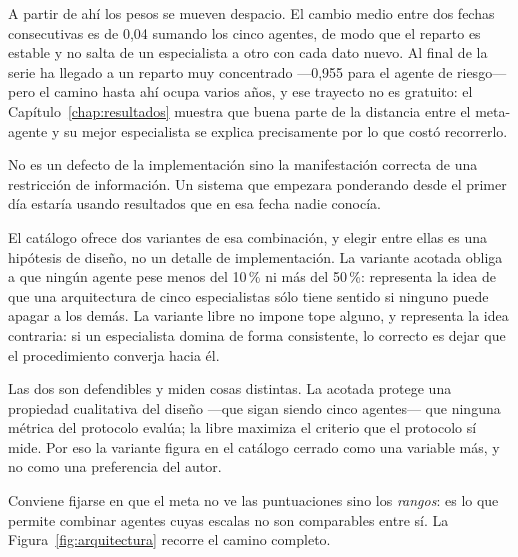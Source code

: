 A partir de ahí los pesos se mueven despacio. El cambio medio entre dos fechas consecutivas es de
0,04 sumando los cinco agentes, de modo que el reparto es estable y no salta de un especialista a
otro con cada dato nuevo. Al final de la serie ha llegado a un reparto muy concentrado ---0,955 para
el agente de riesgo--- pero el camino hasta ahí ocupa varios años, y ese trayecto no es gratuito: el
Capítulo~\ref{chap:resultados} muestra que buena parte de la distancia entre el meta-agente y su
mejor especialista se explica precisamente por lo que costó recorrerlo.

No es un defecto de la implementación sino la manifestación correcta de una restricción de
información. Un sistema que empezara ponderando desde el primer día estaría usando resultados que en
esa fecha nadie conocía.

El catálogo ofrece dos variantes de esa combinación, y elegir entre ellas es una hipótesis de diseño,
no un detalle de implementación. La variante acotada obliga a que ningún agente pese menos
del 10\,\% ni más del 50\,\%: representa la idea de que una arquitectura de cinco especialistas sólo
tiene sentido si ninguno puede apagar a los demás. La variante libre no impone tope alguno,
y representa la idea contraria: si un especialista domina de forma consistente, lo correcto es dejar
que el procedimiento converja hacia él.

Las dos son defendibles y miden cosas distintas. La acotada protege una propiedad cualitativa del
diseño ---que sigan siendo cinco agentes--- que ninguna métrica del protocolo evalúa; la libre
maximiza el criterio que el protocolo sí mide. Por eso la variante figura en el catálogo cerrado
como una variable más, y no como una preferencia del autor.

Conviene fijarse en que el meta no ve las puntuaciones sino los \emph{rangos}: es lo que permite
combinar agentes cuyas escalas no son comparables entre sí. La Figura~\ref{fig:arquitectura} recorre
el camino completo.

